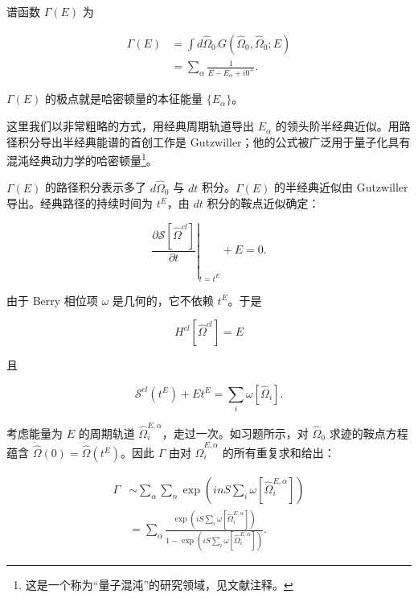 谱函数 $\Gamma(E)$ 为

\begin{align*}
\Gamma ( E ) & = \int d \hat {\Omega} _ {0} \, G ( \hat {\Omega} _ {0}, \hat {\Omega} _ {0}; E )\\
& = \sum_ {\alpha} \frac {1}{E - E _ {\alpha} + i 0 ^ {+}} .
\tag{10.39}
\end{align*}

$\Gamma(E)$ 的极点就是哈密顿量的本征能量 $\{E_{\alpha}\}$。

这里我们以非常粗略的方式，用经典周期轨道导出 $E_{\alpha}$ 的领头阶半经典近似。用路径积分导出半经典能谱的首创工作是 Gutzwiller；他的公式被广泛用于量子化具有混沌经典动力学的哈密顿量\footnote{这是一个称为“量子混沌”的研究领域，见文献注释。}。

$\Gamma(E)$ 的路径积分表示多了 $d\hat{\Omega}_{0}$ 与 $dt$ 积分。$\Gamma(E)$ 的半经典近似由 Gutzwiller 导出。经典路径的持续时间为 $t^{E}$，由 $dt$ 积分的鞍点近似确定：

\begin{equation*}
\left. \frac {\partial \mathcal {S} [ \hat {\Omega} ^ {cl} ]}{\partial t} \right| _ {t = t ^ {E}} + E = 0.
\tag{10.40}
\end{equation*}

由于 Berry 相位项 $\omega$ 是几何的，它不依赖 $t^{E}$。于是

\begin{equation*}
H ^ {cl} [ \hat {\Omega} ^ {cl} ] = E
\tag{10.41}
\end{equation*}

且

\begin{equation*}
\mathcal {S} ^ {cl} ( t ^ {E} ) + E t ^ {E} = \sum_ {i} \omega [ \hat {\Omega} _ {i} ].
\tag{10.42}
\end{equation*}

考虑能量为 $E$ 的周期轨道 $\hat{\Omega}_{i}^{E,\alpha}$，走过一次。如习题所示，对 $\hat{\Omega}_{0}$ 求迹的鞍点方程蕴含 $\dot{\hat{\Omega}}(0)=\dot{\hat{\Omega}}(t^{E})$。因此 $\Gamma$ 由对 $\hat{\Omega}_{i}^{E,\alpha}$ 的所有重复求和给出：

\begin{align*}
\Gamma & \sim \sum_ {\alpha} \sum_ {n} \exp \left( i n S \sum_ {i} \omega [ \hat {\Omega} _ {i} ^ {E, \alpha} ] \right)\\
& = \sum_ {\alpha} \frac {\exp \left( i S \sum_ {i} \omega [ \hat {\Omega} _ {i} ^ {E, \alpha} ] \right)}{1 - \exp \left( i S \sum_ {i} \omega [ \hat {\Omega} _ {i} ^ {E, \alpha} ] \right)} .
\tag{10.43}
\end{align*}

